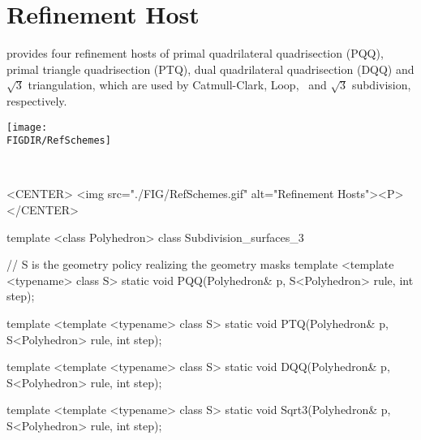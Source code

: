 \section{Refinement Host}
\label{secRefHost}
 provides four refinement hosts of primal 
quadrilateral quadrisection (PQQ), primal triangle 
quadrisection (PTQ), dual quadrilateral 
quadrisection (DQQ) and $\sqrt{3}$ triangulation, which 
are used by Catmull-Clark, Loop, \DS\ and $\sqrt{3}$ subdivision, 
respectively. 

\begin{ccTexOnly}
  \begin{center}
    \parbox{0.6\textwidth}{%
      \texttt{[image: \\FIGDIR/RefSchemes]}%
    }\\ \vspace{0.5cm}
  \end{center}
\end{ccTexOnly}

\begin{ccHtmlOnly}
  <CENTER>
     <img src="./FIG/RefSchemes.gif" alt="Refinement Hosts"><P>
  </CENTER>
\end{ccHtmlOnly}


\begin{ccExampleCode}
template <class Polyhedron>
class Subdivision_surfaces_3 {
  // S is the geometry policy realizing the geometry masks
  template <template <typename> class S>
  static void PQQ(Polyhedron& p, S<Polyhedron> rule, int step);

  template <template <typename> class S>
  static void PTQ(Polyhedron& p, S<Polyhedron> rule, int step);

  template <template <typename> class S>
  static void DQQ(Polyhedron& p, S<Polyhedron> rule, int step);

  template <template <typename> class S>
  static void Sqrt3(Polyhedron& p, S<Polyhedron> rule, int step);
}
\end{ccExampleCode}


